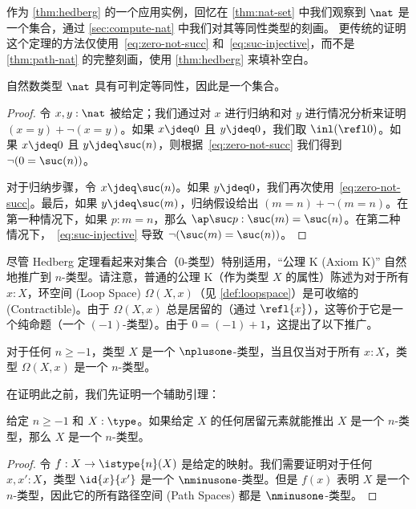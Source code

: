 作为 \cref{thm:hedberg} 的一个应用实例，回忆在 \cref{thm:nat-set} 中我们观察到 $\nat$ 是一个集合，通过 \cref{sec:compute-nat} 中我们对其等同性类型的刻画。
更传统的证明这个定理的方法仅使用~\eqref{eq:zero-not-succ} 和~\eqref{eq:suc-injective}，而不是 \cref{thm:path-nat} 的完整刻画，使用 \cref{thm:hedberg} 来填补空白。

\begin{thm}\label{prop:nat-is-set}
自然数类型 $\nat$ 具有可判定等同性，因此是一个集合。
\end{thm}

\begin{proof}
    令 $x, y : \nat$ 被给定；我们通过对 $x$ 进行归纳和对 $y$ 进行情况分析来证明 $(x=y)+\neg(x=y)$。如果 $x \jdeq 0$ 且 $y \jdeq 0$，我们取 $\inl(\refl0)$。如果 $x \jdeq 0$ 且 $y \jdeq \suc(n)$，则根据~\eqref{eq:zero-not-succ} 我们得到 $\neg (0 = \suc (n))$。

    对于归纳步骤，令 $x \jdeq \suc (n)$。如果 $y \jdeq 0$，我们再次使用~\eqref{eq:zero-not-succ}。最后，如果 $y \jdeq \suc (m)$，归纳假设给出 $(m = n)+\neg(m = n)$。在第一种情况下，如果 $p:m=n$，那么 $\ap \suc p:\suc(m)=\suc(n)$。在第二种情况下，~\eqref{eq:suc-injective} 导致 $\neg(\suc(m)=\suc(n))$。
\end{proof}

%

%
尽管 Hedberg 定理看起来对集合（$0$-类型）特别适用，``公理 K (Axiom K)'' 自然地推广到 $n$-类型。请注意，普通的公理 K（作为类型 $X$ 的属性）陈述为对于所有 $x:X$，环空间 (Loop Space) $\Omega(X,x)$（见 \cref{def:loopspace}）是可收缩的 (Contractible)。由于 $\Omega(X,x)$ 总是居留的（通过 $\refl{x}$），这等价于它是一个纯命题（一个 $(-1)$-类型）。由于 $0 = (-1)+1$，这提出了以下推广。

\begin{thm}\label{thm:hlevel-loops}
对于任何 $n\geq -1$，类型 $X$ 是一个 $\nplusone$-类型，当且仅当对于所有 $x : X$，类型 $\Omega(X, x)$ 是一个 $n$-类型。
\end{thm}

在证明此之前，我们先证明一个辅助引理：

\begin{lem}\label{lem:hlevel-if-inhab-hlevel}
给定 $n \geq -1$ 和 $X : \type$。如果给定 $X$ 的任何居留元素就能推出 $X$ 是一个 $n$-类型，那么 $X$ 是一个 $n$-类型。
\end{lem}
\begin{proof}
    令 $f : X \to \istype{n}(X)$ 是给定的映射。我们需要证明对于任何 $x, x' : X$，类型 $\id{x}{x'}$ 是一个 $\nminusone$-类型。但是 $f(x)$ 表明 $X$ 是一个 $n$-类型，因此它的所有路径空间 (Path Spaces) 都是 $\nminusone$-类型。
\end{proof}

